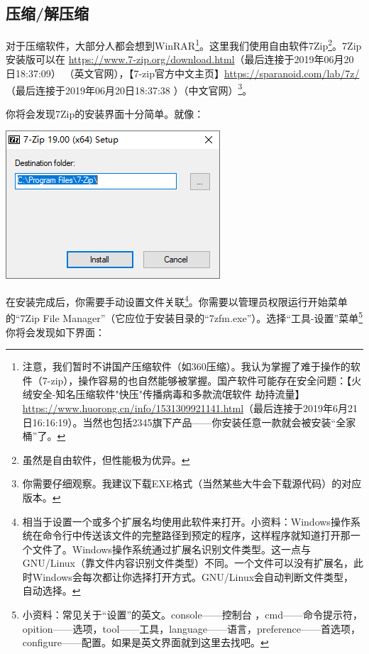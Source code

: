 \documentclass{book}
\begin{document}
\subsection{压缩/解压缩}
对于压缩软件，大部分人都会想到WinRAR\footnote{注意，我们暂时不讲国产压缩软件（如360压缩）。我认为掌握了难于操作的软件（7-zip），操作容易的也自然能够被掌握。国产软件可能存在安全问题：【火绒安全-知名压缩软件"快压"传播病毒和多款流氓软件 劫持流量】\url{https://www.huorong.cn/info/1531309921141.html}（最后连接于2019年6月21日16:16:19）。当然也包括2345旗下产品——你安装任意一款就会被安装“全家桶”了。}。这里我们使用自由软件7Zip\footnote{虽然是自由软件，但性能极为优异。}。7Zip安装版可以在 \url{https://www.7-zip.org/download.html}（最后连接于2019年06月20日18:37:09） （英文官网），【7-zip官方中文主页】\url{https://sparanoid.com/lab/7z/}（最后连接于2019年06月20日18:37:38 ）（中文官网）\footnote{你需要仔细观察。我建议下载EXE格式（当然某些大牛会下载源代码）的对应版本。}。\par
你将会发现7Zip的安装界面十分简单。就像：
\begin{center}
	\includegraphics[scale=0.7]{pic/7zipinst}
\end{center}
在安装完成后，你需要手动设置文件关联\footnote{相当于设置一个或多个扩展名均使用此软件来打开。小资料：Windows操作系统在命令行中传送该文件的完整路径到预定的程序，这样程序就知道打开那一个文件了。Windows操作系统通过扩展名识别文件类型。这一点与GNU/Linux（靠文件内容识别文件类型）不同。一个文件可以没有扩展名，此时Windows会每次都让你选择打开方式。GNU/Linux会自动判断文件类型，自动选择。}。你需要以管理员权限运行开始菜单的“7Zip File Manager”（它应位于安装目录的“7zfm.exe”）。选择“工具-设置”菜单\footnote{小资料：常见关于“设置”的英文。console——控制台 ，cmd——命令提示符，opition——选项，tool——工具，language——语言，preference——首选项，configure——配置。如果是英文界面就到这里去找吧。}你将会发现如下界面：
\end{document}
